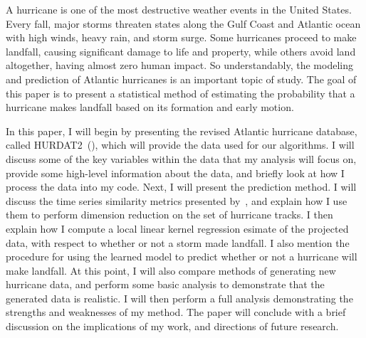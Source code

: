 
\par
A hurricane is one of the most destructive weather events in the United States.
Every fall, major storms threaten states along the Gulf Coast and Atlantic ocean with high winds, heavy rain, and storm surge.
Some hurricanes proceed to make landfall, causing significant damage to life and property, while others avoid land altogether, having almost zero human impact.
So understandably, the modeling and prediction of Atlantic hurricanes is an important topic of study.
The goal of this paper is to present a statistical method of estimating the probability that a hurricane makes landfall based on its formation and early motion.

\par
In this paper, I will begin by presenting the revised Atlantic hurricane database, called HURDAT2~(\cite{landsea2015revised}), which will provide the data used for our algorithms.
I will discuss some of the key variables within the data that my analysis will focus on, provide some high-level information about the data, and briefly look at how I process the data into my code.
Next, I will present the prediction method.
I will discuss the time series similarity metrics presented by~\cite{ho2015manifold}, and explain how I use them to perform dimension reduction on the set of hurricane tracks.
I then explain how I compute a local linear kernel regression esimate of the projected data, with respect to whether or not a storm made landfall.
I also mention the procedure for using the learned model to predict whether or not a hurricane will make landfall.
At this point, I will also compare methods of generating new hurricane data, and perform some basic analysis to demonstrate that the generated data is realistic.
I will then perform a full analysis demonstrating the strengths and weaknesses of my method.
The paper will conclude with a brief discussion on the implications of my work, and directions of future research.